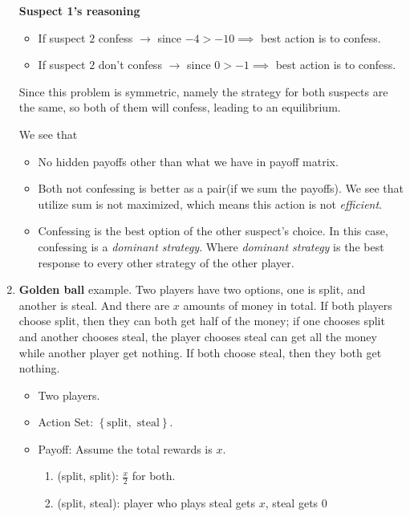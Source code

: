 \begin{eg}
\begin{enumerate}
\begin{answer}
			      \textbf{Suspect 1's reasoning}
			      \begin{itemize}
				      \item If suspect \(2\) confess \(\to \) since \(-4>-10 \implies\) best action is to confess.
				      \item If suspect \(2\) don't confess \(\to \) since \(0>-1 \implies\) best action is to confess.
			      \end{itemize}
			      Since this problem is symmetric, namely the strategy for both suspects are the same, so both of them will confess, leading to an equilibrium.
		      \end{answer}
		      \begin{remark}
			      We see that
			      \begin{itemize}
				      \item No hidden payoffs other than what we have in payoff matrix.
				      \item Both not confessing is better as a pair(if we sum the payoffs). We see that utilize sum is not maximized, which means this action is not \emph{efficient}.
				      \item Confessing is the best option of the other suspect's choice. In this case, confessing is a \emph{dominant strategy}. Where \emph{dominant strategy} is
				            the best response to every other strategy of the other player.
			      \end{itemize}
		      \end{remark}
		\item \textbf{Golden ball} example. Two players have two options, one is split, and another is steal. And there are \(x\) amounts of money in total. If both players choose split, then they
		      can both get half of the money; if one chooses split and another chooses steal, the player chooses steal can get all the money while another player get nothing. If both choose steal, then they both get
		      nothing.
		      \begin{itemize}
			      \item Two players.
			      \item Action Set: \(\left\{\text{split}, \text{ steal}\right\}\).
			      \item Payoff: Assume the total rewards is \(x\).
			            \begin{enumerate}
				            \item (split, split): \(\frac{x}{2}\) for both.
				            \item (split, steal): player who plays steal gets \(x\), steal gets \(0\)

\end{enumerate}
\end{itemize}
\end{enumerate}
\end{eg}
